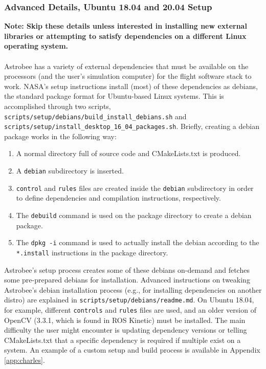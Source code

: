 \documentclass{article}
\begin{document}
\subsubsection{Advanced Details, Ubuntu 18.04 and 20.04 Setup}

\noindent\textbf{Note: Skip these details unless interested in installing new external libraries or attempting to satisfy dependencies on a different Linux operating system.}
\\\\
Astrobee has a variety of external dependencies that must be available on the processors (and the user's simulation computer) for the flight software stack to work. NASA's setup instructions install (most) of these dependencies as debians, the standard package format for Ubuntu-based Linux systems. This is accomplished through two scripts, \texttt{scripts/setup/debians/build\_install\_debians.sh} and \texttt{scripts/setup/install\_desktop\_16\_04\_packages.sh}. Briefly, creating a debian package works in the following way:
\begin{enumerate}
    \item A normal directory full of source code and CMakeLists.txt is produced.
    \item A \texttt{debian} subdirectory is inserted.
    \item \texttt{control} and \texttt{rules} files are created inside the \texttt{debian} subdirectory in order to define dependencies and compilation instructions, respectively.
    \item The \texttt{debuild} command is used on the package directory to create a debian package.
    \item The \texttt{dpkg -i} command is used to actually install the debian according to the \texttt{*.install} instructions in the package directory. 
\end{enumerate}

Astrobee's setup process creates some of these debians on-demand and fetches some pre-prepared debians for installation. Advanced instructions on tweaking Astrobee's debian installation process (e.g., for installing dependencies on another distro) are explained in \texttt{scripts/setup/debians/readme.md}. On Ubuntu 18.04, for example, different \texttt{controls} and \texttt{rules} files are used, and an older version of OpenCV (3.3.1, which is found in ROS Kinetic) must be installed. The main difficulty the user might encounter is updating dependency versions or telling CMakeLists.txt that a specific dependency is required if multiple exist on a system. An example of a custom setup and build process is available in Appendix \ref{app:charles}.
\end{document}
